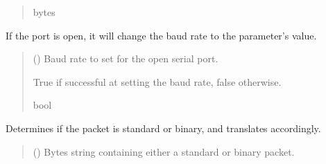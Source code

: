 \documentclass[letterpaper,10pt,english]{sphinxmanual}
\begin{document}
\begin{fulllineitems}
\begin{fulllineitems}
\begin{quote}
\begin{description}
\sphinxAtStartPar
bytes

\end{description}\end{quote}

\end{fulllineitems}


\begin{fulllineitems}
\label{\detokenize{BasicPodProtocol:BasicPodProtocol.POD_Basics.SetBaudrateOfDevice}}
\pysigstartsignatures
{}
\pysigstopsignatures
\sphinxAtStartPar
If the port is open, it will change the baud rate to the parameter’s value.
\begin{quote}\begin{description}
\sphinxAtStartPar
{} () \textendash{} Baud rate to set for the open serial port.

\sphinxAtStartPar
True if successful at setting the baud rate, false otherwise.

\sphinxAtStartPar
bool

\end{description}\end{quote}

\end{fulllineitems}


\begin{fulllineitems}
\label{\detokenize{BasicPodProtocol:BasicPodProtocol.POD_Basics.TranslatePODpacket}}
\pysigstartsignatures
{}
\pysigstopsignatures
\sphinxAtStartPar
Determines if the packet is standard or binary, and translates accordingly.
\begin{quote}\begin{description}
\sphinxAtStartPar
{} () \textendash{} Bytes string containing either a standard or binary packet.


\end{description}
\end{quote}
\end{fulllineitems}
\end{fulllineitems}
\end{document}
